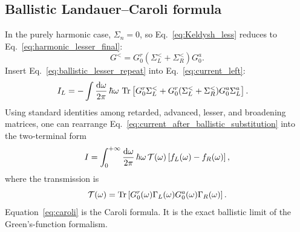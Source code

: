 \subsection{Ballistic Landauer--Caroli formula}
In the purely harmonic case, $\Sigma_n = 0$, so Eq.~\eqref{eq:Keldysh_less} reduces to Eq.~\eqref{eq:harmonic_lesser_final}:
\begin{equation}
    G^< = G_0^r(\Sigma_L^< + \Sigma_R^<)G_0^a.
    \label{eq:ballistic_lesser_repeat}
\end{equation}
Insert Eq.~\eqref{eq:ballistic_lesser_repeat} into Eq.~\eqref{eq:current_left}:
\begin{align}
    I_L
    &= -\int\frac{\mathrm{d}\omega}{2\pi}\,\hbar\omega\,
    \operatorname{Tr}\left[ G_0^r\Sigma_L^< + G_0^r(\Sigma_L^< + \Sigma_R^<)G_0^a\Sigma_L^a \right].
    \label{eq:current_after_ballistic_substitution}
\end{align}
Using standard identities among retarded, advanced, lesser, and broadening matrices, one can rearrange Eq.~\eqref{eq:current_after_ballistic_substitution} into the two-terminal form
\begin{equation}
    I = \int_0^{+\infty}\frac{\mathrm{d}\omega}{2\pi}\,\hbar\omega\,\mathcal{T}(\omega)\left[ f_L(\omega)-f_R(\omega) \right],
    \label{eq:landauer_phonon}
\end{equation}
where the transmission is
\begin{equation}
    \mathcal{T}(\omega) = \operatorname{Tr}\left[ G_0^r(\omega)\Gamma_L(\omega)G_0^a(\omega)\Gamma_R(\omega) \right].
    \label{eq:caroli}
\end{equation}
Equation~\eqref{eq:caroli} is the Caroli formula. It is the exact ballistic limit of the Green's-function formalism.

